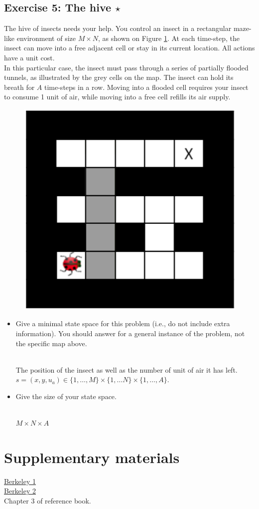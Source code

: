 \documentclass[9pt,a4paper]{extarticle}
\newenvironment{solution}
    {%
    \color{red}
    }
    { 
    \color{black}
    }
\begin{document}
\subsection*{Exercise 5: The hive $\star$}
The hive of insects needs your help. You control an insect in a rectangular maze-like environment
of size $M \times N$, as shown on Figure \ref{fig:hive}. At each time-step,
the insect can move into a free adjacent cell or stay in its current
location. All actions have a unit cost. \\
In this particular case, the insect must pass through a series of partially
flooded tunnels, as illustrated by the grey cells on the map. The insect can hold its breath for $A$ time-steps in a row. Moving
into a flooded cell requires your insect to consume 1 unit of air, while
moving into a free cell refills its air supply.
\begin{figure}[H]
    \centering
    \includegraphics[width=.2 \textwidth]{figures/hive.png}
    \label{fig:hive}
\end{figure}
\begin{itemize}
    \item Give a minimal state space for this problem (i.e., do not include extra information). You should
answer for a general instance of the problem, not the specific map above.
\begin{solution}
\\
The position of the insect  as well as the number of unit of air it has left. $s = (x, y, u_a) \in \{1, \hdots, M\} \times \{1, \hdots N\} \times \{1, \hdots, A\}$.
\end{solution}
    \item Give the size of your state space.
    \begin{solution}
    \\
    $M\times N \times A$ 
    \end{solution}
\end{itemize}
   \section*{Supplementary materials}
   \href{http://ai.berkeley.edu/sections/section_0_v55LOfoUUwiW1k6Nchnk3Dw6WQuTW8.pdf}{Berkeley 1}\\
   \href{http://ai.berkeley.edu/sections/section_1_0hzy6TFupb1Z3bckfRXdC5KYpsdZOE.pdf}{Berkeley 2}\\
   Chapter 3 of reference book.
\end{document}

